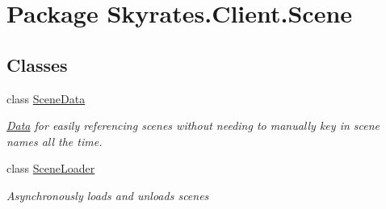 \hypertarget{namespace_skyrates_1_1_client_1_1_scene}{\section{Package Skyrates.\-Client.\-Scene}
\label{namespace_skyrates_1_1_client_1_1_scene}
}
\subsection*{Classes}
\begin{DoxyCompactItemize}
\item 
class \hyperlink{class_skyrates_1_1_client_1_1_scene_1_1_scene_data}{Scene\-Data}
\begin{DoxyCompactList}\small\item\em \hyperlink{namespace_skyrates_1_1_client_1_1_data}{Data} for easily referencing scenes without needing to manually key in scene names all the time. \end{DoxyCompactList}\item 
class \hyperlink{class_skyrates_1_1_client_1_1_scene_1_1_scene_loader}{Scene\-Loader}
\begin{DoxyCompactList}\small\item\em Asynchronously loads and unloads scenes \end{DoxyCompactList}\end{DoxyCompactItemize}
